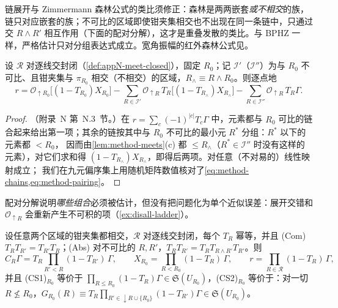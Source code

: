 链展开与 Zimmermann 森林公式\cite{Zimmermann1969}的类比须修正：森林是两两嵌套\emph{或不相交}的族，链只对应嵌套的族；不可比的区域即使钳夹集相交也不出现在同一条链中，只通过交 $R\wedge R'$
相互作用（下面的配对分解），这才是重叠发散的类比。与 BPHZ 一样，严格估计只对分组表达式成立。宽角振幅的红外森林公式见\cite{Ma2020}。

\begin{lemma}[配对分解]\label{lem:method-pairing}
设 $\mathcal R$ 对逐线交封闭（\cref{def:appN-meet-closed}），固定 $R_0$；记 $\mathcal I'$（$\mathcal I''$）为与 $R_0$ 不可比、且钳夹集与 $\pi_{R_0}$ 相交（不相交）的区域，$R_\wedge\equiv R\wedge R_0$。则逐点地
\begin{equation}\label{eq:method-pairing}
r=\mathcal O_{\uparrow R_0}\bigl[(1-T_{R_0})X_{R_0}\bigr]-\sum_{R\in\mathcal I'}\mathcal O_{\uparrow R}\,T_R\bigl[(1-T_{R_\wedge})X_{R_\wedge}\bigr]-\sum_{R\in\mathcal I''}\mathcal O_{\uparrow R}\,T_R\Gamma .
\end{equation}
\end{lemma}

\begin{proof}
（附录~N 第~N.3~节。）在 $r=\sum_c(-1)^{|c|}T_c\Gamma$ 中，元素都与 $R_0$ 可比的链合起来给出第一项；其余的链按其中与 $R_0$ 不可比的最小元 $R^*$ 分组：$R^*$ 以下的元素都 $<R_0$，
因而由\cref{lem:method-meets}(c) 都 $\le R_\wedge$（$R^*\in\mathcal I''$ 时没有这样的元素），对它们求和得 $(1-T_{R_\wedge})X_{R_\wedge}$，即得后两项。对任意（不对易的）线性映射成立；
我们在九元偏序集上用随机矩阵数值核对了\cref{eq:method-chains,eq:method-pairing}。%
\end{proof}

配对分解说明\emph{哪些组合}必须被估计，但没有把问题化为单个近似误差：展开交错和 $\mathcal O_{\uparrow R}$ 会重新产生不可积的项（\cref{ex:disall-ladder}）。

\begin{proposition}[乘积公式]\label{prop:method-product}
设任意两个区域的钳夹集都相交，$\mathcal R$ 对逐线交封闭，每个 $T_R$ 幂等，并且 (Com) $T_RT_{R'}=T_{R'}T_R$；(Abs) 对不可比的 $R,R'$，$T_RT_{R'}=T_RT_{R\wedge R'}T_{R'}$。则
\begin{equation}\label{eq:method-product}
C_R\Gamma=T_R\prod_{R'<R}(1-T_{R'})\,\Gamma,\qquad X_{R_0}=\prod_{R<R_0}(1-T_R)\,\Gamma,\qquad r=\prod_{R\in\mathcal R}(1-T_R)\,\Gamma ,
\end{equation}
并且 (CS1)$_{R_0}$ 等价于 $\prod_{R\le R_0}(1-T_R)\Gamma\in\mathfrak S(U_{R_0})$，(CS2)$_{R_0}$ 等价于：对一切 $R\not\le R_0$，$G_{R_0}(R)\equiv T_R\prod_{R'\in\downarrow R\cup\{R_0\}}(1-T_{R'})\Gamma\in\mathfrak S(U_{R_0})$。
\end{proposition}

